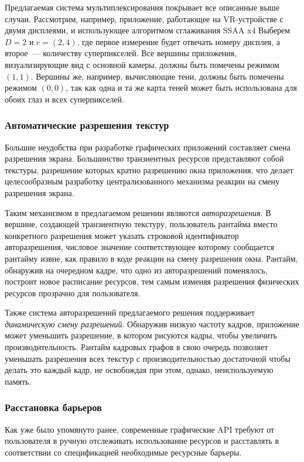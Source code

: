 Предлагаемая система мультиплексирования покрывает все описанные выше случаи.
Рассмотрим, например, приложение, работающее на VR-устройстве с двумя дисплеями, и использующее алгоритмом сглаживания SSAA x4
Выберем $D = 2$ и $c = (2, 4)$, где первое измерение будет отвечать номеру дисплея, а второе~--- количеству суперпикселей.
Все вершины приложения, визуализирующие вид с основной камеры, должны быть помечены режимом $(1, 1)$.
Вершины же, например, вычисляющие тени, должны быть помечены режимом $(0, 0)$, так как одна и та же карта теней может быть использована для обоих глаз и всех суперпикселей.

\subsubsection{Автоматические разрешения текстур}
Большие неудобства при разработке графических приложений составляет смена разрешения экрана.
Большинство транзиентных ресурсов представляют собой текстуры, разрешение которых кратно разрешению окна приложения, что делает целесообразным разработку централизованного механизма реакции на смену разрешения экрана.

Таким механизмом в предлагаемом решении являются \textit{авторазрешения}.
В вершине, создающей транзиентную текстуру, пользователь рантайма вместо конкретного разрешения может указать строковой идентификатор авторазрешения, числовое значение соответствующее которому сообщается рантайму извне, как правило в коде реакции на смену разрешения окна.
Рантайм, обнаружив на очередном кадре, что одно из авторазрешений поменялось, построит новое расписание ресурсов, тем самым изменяя разрешения физических ресурсов прозрачно для пользователя.

Также система авторазрешений предлагаемого решения поддерживает \textit{динамическую смену разрешений}.
Обнаружив низкую частоту кадров, приложение может уменьшить разрешение, в котором рисуются кадры, чтобы увеличить производительность.
Рантайм кадровых графов в свою очередь позволяет уменьшать разрешения всех текстур с производительностью достаточной чтобы делать это каждый кадр, не освобождая при этом, однако, неиспользуемую память.

\subsubsection{Расстановка барьеров}
Как уже было упомянуто ранее, современные графические API требуют от пользователя в ручную отслеживать использование ресурсов и расставлять в соответствии со спецификацией необходимые ресурсные барьеры.

